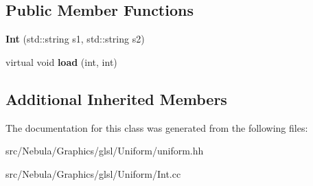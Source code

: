 \subsection*{Public Member Functions}
\begin{DoxyCompactItemize}
\item 
\hypertarget{classNeb_1_1glsl_1_1Uniform_1_1Vector_1_1Int_a48b39d8547200b58574b24e47a921979}{{\bfseries Int} (std\-::string s1, std\-::string s2)}\label{classNeb_1_1glsl_1_1Uniform_1_1Vector_1_1Int_a48b39d8547200b58574b24e47a921979}

\item 
\hypertarget{classNeb_1_1glsl_1_1Uniform_1_1Vector_1_1Int_ad6b47e720ddda93b9c31ea544c28a3d6}{virtual void {\bfseries load} (int, int)}\label{classNeb_1_1glsl_1_1Uniform_1_1Vector_1_1Int_ad6b47e720ddda93b9c31ea544c28a3d6}

\end{DoxyCompactItemize}
\subsection*{Additional Inherited Members}


The documentation for this class was generated from the following files\-:\begin{DoxyCompactItemize}
\item 
src/\-Nebula/\-Graphics/glsl/\-Uniform/uniform.\-hh\item 
src/\-Nebula/\-Graphics/glsl/\-Uniform/Int.\-cc\end{DoxyCompactItemize}
